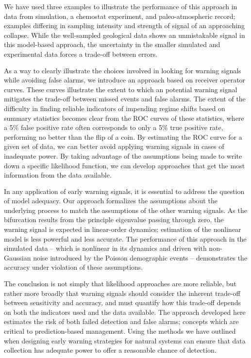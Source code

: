 \documentclass[authoryear,review,11pt]{elsarticle}
\begin{document}
We have used three examples to illustrate the performance of this approach in data from 
simulation, a chemostat experiment, and paleo-atmospheric record; examples differing in 
sampling intensity and strength of signal of an approaching collapse.  
While the well-sampled geological data shows an unmistakable signal in this model-based approach,
the uncertainty in the smaller simulated and experimental data forces a trade-off between errors.  
 
As a way to clearly illustrate the choices involved in looking for warning signals while avoiding false alarms,
we introduce an approach based on receiver operator curves. 
These curves illustrate the extent to which an potential warning signal mitigates the trade-off 
between missed events and false alarms.  
The extent of the difficulty in finding reliable indicators of impending regime shifts
based on summary statistics becomes clear from the ROC curves of these statistics,
where a 5\% false positive rate often corresponds to only a 5\% true positive rate,
performing no better than the flip of a coin. %
By estimating the ROC curve for a given set of data,
we can better avoid applying warning signals in cases of inadequate power.
By taking advantage of the assumptions being made to write down a specific likelihood function,
we can develop approaches that get the most information from the data available.



In any application of early warning signals, it is essential to address the question of model adequacy.
Our approach formalizes the assumptions about the underlying process to match the assumptions of the other warning signals.
As the bifurcation results from the principle eigenvalue passing through zero,
the warning signal is expected in linear-order dynamics;
estimation of the nonlinear model is less powerful and less accurate.
The performance of this approach in the simulated data -- which is nonlinear in its dynamics
and driven with non-Gaussian noise introduced by the Poisson demographic events --
demonstrates the accuracy under violation of these assumptions.

The conclusion is not simply that likelihood approaches are more reliable,
but rather more broadly that warning signals should consider
the inherent trade-off between sensitivity and accuracy,
and must quantify how this trade-off depends on both the indicators used and the data available.
The approach developed here estimates the risk of both failed detection and false alarms;
concepts which are critical to prediction-based management.
Using the methods we have outlined when designing early warning strategies for natural systems
can ensure that data collection has adequate power to offer a reasonable chance of detection.
\end{document}
